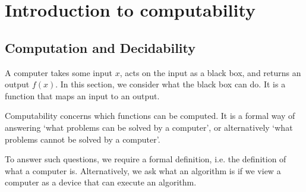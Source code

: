 \documentclass[a4paper, openany]{memoir}
\begin{document}
\chapter{Introduction to computability}
\section{Computation and Decidability}
A computer takes some input $x$, acts on the input as a black box, and returns an output $f(x)$. In this section, we consider what the black box can do. It is a function that maps an input to an output. 

Computability concerns which functions can be computed. It is a formal way of answering `what problems can be solved by a computer', or alternatively `what problems cannot be solved by a computer'.

To answer such questions, we require a formal definition, i.e. the definition of what a computer is. Alternatively, we ask what an algorithm is if we view a computer as a device that can execute an algorithm.
\end{document}
